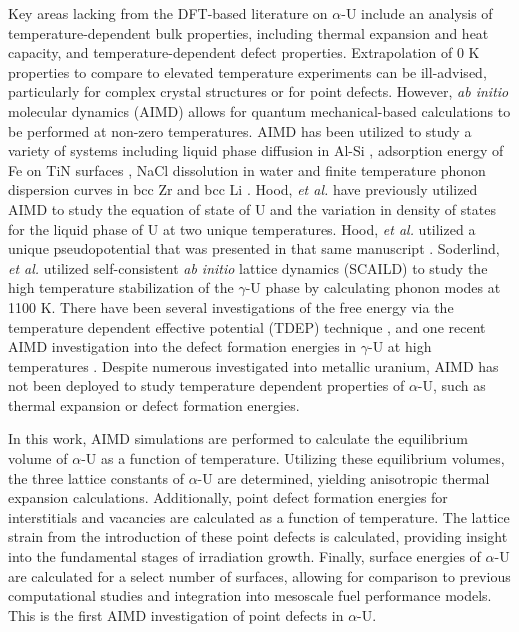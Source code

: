 \documentclass[review]{elsarticle}
\begin{document}
Key areas lacking from the DFT-based literature on $\alpha$-U include an analysis of temperature-dependent bulk properties, including thermal expansion and heat capacity, and temperature-dependent defect properties. Extrapolation of 0 K properties to compare to elevated temperature experiments can be ill-advised, particularly for complex crystal structures or for point defects. However, \textit{ab initio} molecular dynamics (AIMD) allows for quantum mechanical-based calculations to be performed at non-zero temperatures. AIMD has been utilized to study a variety of systems including liquid phase diffusion in Al-Si \cite{manga2018}, adsorption energy of Fe on TiN surfaces \cite{wang2010}, NaCl dissolution in water \cite{timko2010} and finite temperature phonon dispersion curves in bcc Zr and bcc Li \cite{hellman2011}. Hood, \textit{et al.} \cite{hood2008} have previously utilized AIMD to study the equation of state of U and the variation in density of states for the liquid phase of U at two unique temperatures. Hood, \textit{et al.} utilized a unique pseudopotential that was presented in that same manuscript \cite{hood2008}. Soderlind, \textit{et al.} \cite{soderlind2012} utilized self-consistent \textit{ab initio} lattice dynamics (SCAILD) to study the high temperature stabilization of the $\gamma$-U phase by calculating phonon modes at 1100 K. There have been several investigations of the free energy via the temperature dependent effective potential (TDEP) technique \cite{hellman2013, ladygin2020, kruglov2019, bouchet2017, castellano2020}, and one recent AIMD investigation into the defect formation energies in $\gamma$-U at high temperatures \cite{beelerAIMD}. Despite numerous investigated into metallic uranium, AIMD has not been deployed to study temperature dependent properties of $\alpha$-U, such as thermal expansion or defect formation energies. 

In this work, AIMD simulations are performed to calculate the equilibrium volume of $\alpha$-U as a function of temperature. Utilizing these equilibrium volumes, the three lattice constants of $\alpha$-U are determined, yielding anisotropic thermal expansion calculations. Additionally, point defect formation energies for interstitials and vacancies are calculated as a function of temperature. The lattice strain from the introduction of these point defects is calculated, providing insight into the fundamental stages of irradiation growth. Finally, surface energies of $\alpha$-U are calculated for a select number of surfaces, allowing for comparison to previous computational studies and integration into mesoscale fuel performance models. This is the first AIMD investigation of point defects in $\alpha$-U. 
\end{document}
